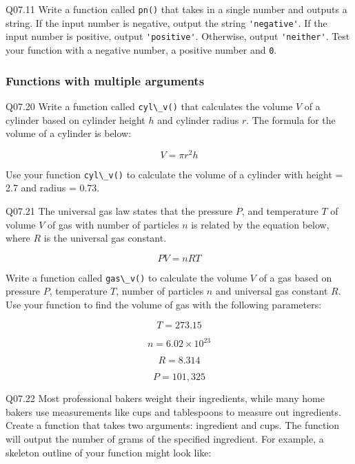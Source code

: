 \documentclass{book}
\newenvironment{problems}{}{}  %
\newcommand{\passthrough}[1]{#1}
\begin{document}
\begin{problems}
Q07.11 Write a function called \passthrough{\lstinline!pn()!} that takes
in a single number and outputs a string. If the input number is
negative, output the string \passthrough{\lstinline!'negative'!}. If the
input number is positive, output \passthrough{\lstinline!'positive'!}.
Otherwise, output \passthrough{\lstinline!'neither'!}. Test your
function with a negative number, a positive number and
\passthrough{\lstinline!0!}.
        \end{problems}

    




    
        \hypertarget{functions-with-multiple-arguments}{%
\subsubsection{Functions with multiple
arguments}\label{functions-with-multiple-arguments}}

Q07.20 Write a function called \passthrough{\lstinline!cyl\_v()!} that
calculates the volume \(V\) of a cylinder based on cylinder height \(h\)
and cylinder radius \(r\). The formula for the volume of a cylinder is
below:

\[ V = \pi r^2 h \]

Use your function \passthrough{\lstinline!cyl\_v()!} to calculate the
volume of a cylinder with height = 2.7 and radius = 0.73.

Q07.21 The universal gas law states that the pressure \(P\), and
temperature \(T\) of volume \(V\) of gas with number of particles \(n\)
is related by the equation below, where \(R\) is the universal gas
constant.

\[ PV = nRT \]

Write a function called \passthrough{\lstinline!gas\_v()!} to calculate
the volume \(V\) of a gas based on pressure \(P\), temperature \(T\),
number of particles \(n\) and universal gas constant \(R\). Use your
function to find the volume of gas with the following parameters:

\[ T = 273.15\]

\[ n = 6.02 \times 10^{23} \]

\[ R = 8.314 \]

\[ P = 101,325 \]

Q07.22 Most professional bakers weight their ingredients, while many
home bakers use measurements like cups and tablespoons to measure out
ingredients. Create a function that takes two arguments: ingredient and
cups. The function will output the number of grams of the specified
ingredient. For example, a skeleton outline of your function might look
like:
\end{document}

